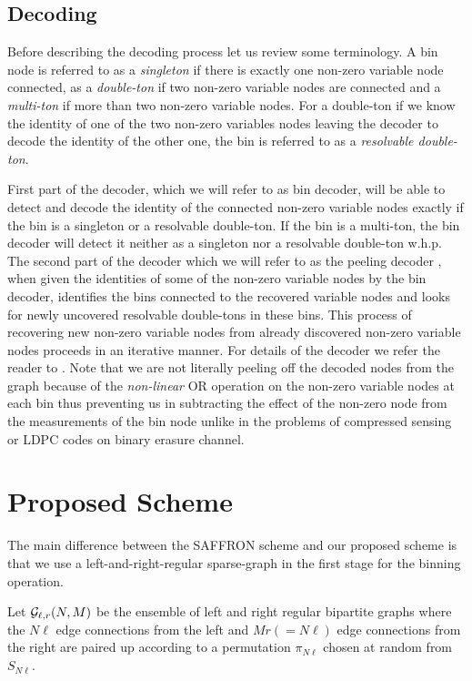 \documentclass[conference,twocolumn]{IEEEtran}
\begin{document}
\subsection*{Decoding}
Before describing the decoding process let us review some terminology. A bin node is referred to as a \textit{singleton} if there is exactly one non-zero variable node connected, as a \textit{double-ton} if two non-zero variable nodes are connected and a \textit{multi-ton} if more than two non-zero variable nodes. For a double-ton if we know the identity of one of the two non-zero variables nodes leaving the decoder to decode the identity of the other one, the bin is referred to as a \textit{resolvable double-ton}.

First part of the decoder, which we will refer to as bin decoder, will be able to detect and decode the identity of the connected non-zero variable nodes exactly if the bin is a singleton or a resolvable double-ton. If the bin is a multi-ton, the bin decoder will detect it neither as a singleton nor a resolvable double-ton w.h.p. The second part of the decoder which we will refer to as the peeling decoder \cite{li2015subisit}, when given the identities of some of the non-zero variable nodes by the bin decoder, identifies the bins connected to the recovered variable nodes and looks for newly uncovered resolvable double-tons in these bins. This process of recovering new non-zero variable nodes from already discovered non-zero variable nodes proceeds in an iterative manner. For details of the decoder we refer the reader to \cite{lee2015saffron,vem2017regular}. Note that we are not literally peeling off the decoded nodes from the graph because of the \textit{non-linear} OR operation on the non-zero variable nodes at each bin thus preventing us in subtracting the effect of the non-zero node from the measurements of the bin node unlike in the problems of compressed sensing or LDPC codes on binary erasure channel.

\section{Proposed Scheme}
The main difference between the SAFFRON scheme and our proposed scheme is that we use a left-and-right-regular sparse-graph in the first stage for the binning operation.

\begin{definition}
Let $\mathcal{G}_{\ell,r}(N,M)$ be the ensemble of left and right regular bipartite graphs where the $N\ell$ edge connections from the left and $Mr(=N\ell)$ edge connections from the right are paired up according to a permutation $\pi_{N\ell}$ chosen at random from $S_{N\ell}$.
\end{definition}
\end{document}
